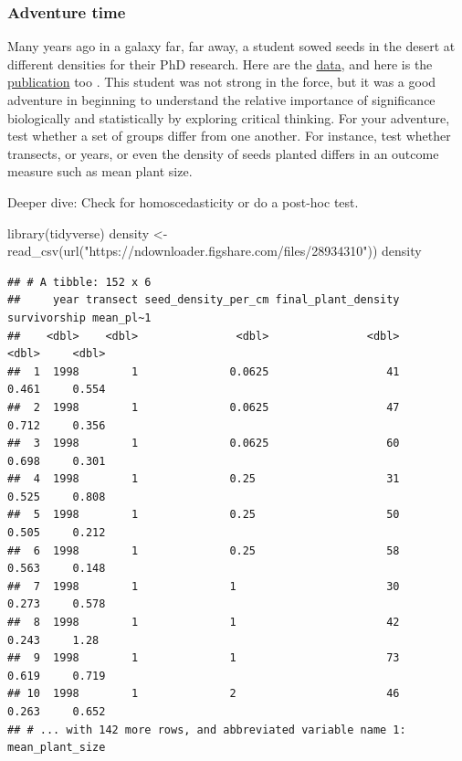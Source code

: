 \documentclass[
]{book}
\newenvironment{Shaded}{\begin{snugshade}}{\end{snugshade}}
\newcommand{\FunctionTok}[1]{\textcolor[rgb]{0.00,0.00,0.00}{#1}}
\newcommand{\NormalTok}[1]{#1}
\newcommand{\OtherTok}[1]{\textcolor[rgb]{0.56,0.35,0.01}{#1}}
\newcommand{\StringTok}[1]{\textcolor[rgb]{0.31,0.60,0.02}{#1}}
\begin{document}
\hypertarget{adventure-time-1}{%
\subsubsection*{Adventure time}\label{adventure-time-1}}

Many years ago in a galaxy far, far away, a student sowed seeds in the desert at different densities for their PhD research. Here are the \href{https://figshare.com/articles/dataset/Density_experiment_in_Negev_Desert_Israel/669703}{data}, and here is the \href{https://besjournals.onlinelibrary.wiley.com/doi/10.1046/j.1365-2745.2002.00686.x}{publication} too \citep{RN3094}. This student was not strong in the force, but it was a good adventure in beginning to understand the relative importance of significance biologically and statistically by exploring critical thinking. For your adventure, test whether a set of groups differ from one another. For instance, test whether transects, or years, or even the density of seeds planted differs in an outcome measure such as mean plant size.

Deeper dive: Check for homoscedasticity or do a post-hoc test.

\begin{Shaded}
\begin{Highlighting}[]
\FunctionTok{library}\NormalTok{(tidyverse)}
\NormalTok{density }\OtherTok{\textless{}{-}} \FunctionTok{read\_csv}\NormalTok{(}\FunctionTok{url}\NormalTok{(}\StringTok{"https://ndownloader.figshare.com/files/28934310"}\NormalTok{))}
\NormalTok{density}
\end{Highlighting}
\end{Shaded}

\begin{verbatim}
## # A tibble: 152 x 6
##     year transect seed_density_per_cm final_plant_density survivorship mean_pl~1
##    <dbl>    <dbl>               <dbl>               <dbl>        <dbl>     <dbl>
##  1  1998        1              0.0625                  41        0.461     0.554
##  2  1998        1              0.0625                  47        0.712     0.356
##  3  1998        1              0.0625                  60        0.698     0.301
##  4  1998        1              0.25                    31        0.525     0.808
##  5  1998        1              0.25                    50        0.505     0.212
##  6  1998        1              0.25                    58        0.563     0.148
##  7  1998        1              1                       30        0.273     0.578
##  8  1998        1              1                       42        0.243     1.28 
##  9  1998        1              1                       73        0.619     0.719
## 10  1998        1              2                       46        0.263     0.652
## # ... with 142 more rows, and abbreviated variable name 1: mean_plant_size
\end{verbatim}
\end{document}
